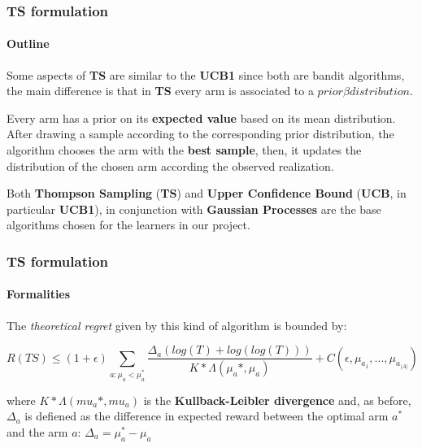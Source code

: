 
\begin{frame}

\frametitle{TS formulation}
\framesubtitle{Outline}

Some aspects of \textbf{TS} are similar to the \textbf{UCB1} since both are bandit algorithms, the main difference is that in \textbf{TS} every arm is associated to a $prior \beta distribution$.

Every arm has a prior on its \textbf{expected value} based on its mean distribution.
After drawing a sample according to the corresponding prior distribution, the algorithm chooses the arm with the \textbf{best sample}, then, it updates the distribution of the chosen arm according the observed realization.

Both \textbf{Thompson Sampling} (\textbf{TS}) and \textbf{Upper Confidence Bound} (\textbf{UCB}, in particular \textbf{UCB1}), in conjunction with \textbf{Gaussian Processes} are the base algorithms chosen for the learners in our project.

\end{frame}


\begin{frame}[fragile]

\frametitle{TS formulation}
\framesubtitle{Formalities}

The \textit{theoretical regret} given by this kind of algorithm is bounded by:

\begin{displaymath}
R(TS) \le (1+\epsilon) \sum_{a:\mu_a < \mu_a^*} \frac{\Delta_a(log(T)+log(log(T)))}{K*\Lambda(\mu_a*, \mu_a)} + C (\epsilon, \mu_{a_1} , ... , \mu_{a_{\left|A\right|}})
\end{displaymath}

where $K*\Lambda(mu_a*,mu_a)$ is the \textbf{Kullback-Leibler divergence} and, as before, $\Delta_a$ is defiened as the difference in expected reward between the optimal arm $a^*$ and the arm $a$: $\Delta_a = \mu_a^* - \mu_a$

\end{frame}

